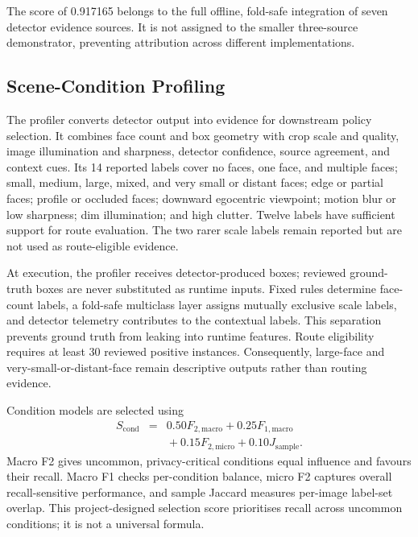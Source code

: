 \documentclass[10pt,twocolumn]{IEEEtran}
\begin{document}
The score of 0.917165 belongs to the full offline, fold-safe integration of
seven detector evidence sources. It is not assigned to the smaller three-source
demonstrator, preventing attribution across different implementations.

\subsection{Scene-Condition Profiling}

The profiler converts detector output into evidence for downstream policy
selection. It combines face count and box geometry with crop scale and quality,
image illumination and sharpness, detector confidence, source agreement, and
context cues. Its 14 reported labels cover no faces, one face, and multiple faces;
small, medium, large, mixed, and very small or distant faces; edge or partial
faces; profile or occluded faces; downward egocentric viewpoint; motion blur or
low sharpness; dim illumination; and high clutter. Twelve labels have sufficient
support for route evaluation. The two rarer scale labels remain reported but
are not used as route-eligible evidence.

At execution, the profiler receives detector-produced boxes; reviewed
ground-truth boxes are never substituted as runtime inputs. Fixed rules
determine face-count labels, a fold-safe multiclass layer assigns mutually
exclusive scale labels, and detector telemetry contributes to the contextual
labels. This separation prevents ground truth from leaking into runtime features. Route
eligibility requires at least 30 reviewed positive instances. Consequently,
large-face and very-small-or-distant-face remain descriptive outputs rather
than routing evidence.

Condition models are selected using
\begin{equation}
\begin{array}{rcl}
S_{\mathrm{cond}}&=&0.50F_{2,\mathrm{macro}}+0.25F_{1,\mathrm{macro}}\\
&&{}+0.15F_{2,\mathrm{micro}}+0.10J_{\mathrm{sample}} .
\end{array}
\label{eq:condition-score}
\end{equation}
Macro F2 gives uncommon, privacy-critical conditions equal influence and
favours their recall. Macro F1 checks per-condition balance, micro F2 captures
overall recall-sensitive performance, and sample Jaccard measures per-image
label-set overlap. This project-designed selection score prioritises recall
across uncommon conditions; it is not a universal formula.
\end{document}
